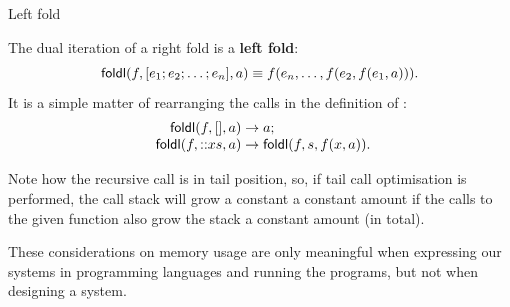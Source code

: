 %
\begin{frame}{Left fold}

  The dual iteration of a right fold is a \textbf{left fold}:
  \begin{equation*}
    \textsf{foldl}(f,[e_1; e_2; \ldots; e_n], a) \equiv f(e_n, \ldots,
    f(e_2, f(e_1, a))).
  \end{equation*}
  It is a simple matter of rearranging the calls in the definition of
  :
  \begin{equation*}
    \begin{array}{r@{\;}c@{\;}l@{}}
      \fun{foldl} (f, [], a) & \rightarrow & a;\\
      \fun{foldl} (f, \cons{x}{s}, a) & \rightarrow &\fun{foldl}(f, s, f(x,a)).
    \end{array}
  \end{equation*}

  Note how the recursive call is in tail position, so, if tail call
  optimisation is performed, the call stack will grow a constant a
  constant amount if the calls to the given function also grow the
  stack a constant amount (in total).

  \bigskip

  These considerations on memory usage are only meaningful when
  expressing our systems in programming languages and running the
  programs, but not when designing a system.

\end{frame}
